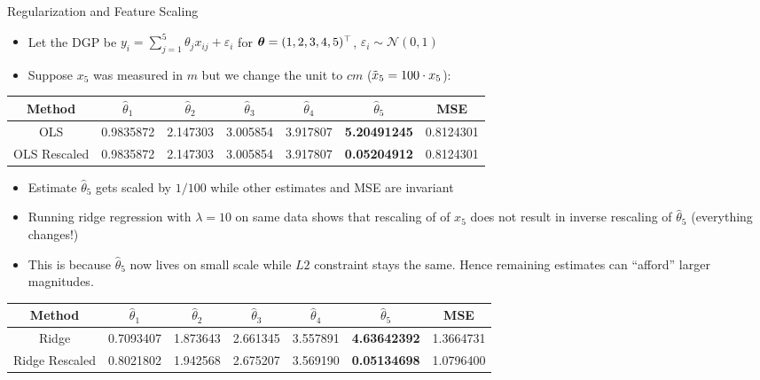 \documentclass[11pt,compress,t,notes=noshow, xcolor=table]{beamer}
\begin{document}
\begin{vbframe}{Regularization and Feature Scaling}
\footnotesize{
\begin{itemize}
    \item Let the DGP be $y_i = \sum_{j=1}^{5} \theta_j x_{ij} +\varepsilon_i$ for $\bm{\theta}=(1,2,3,4,5)^\top$, $\varepsilon_i \sim \mathcal{N}(0,1)$ %
    \item Suppose $x_5$ was measured in $m$ but we change the unit to $cm$ ($\Tilde{x}_5=100 \cdot x_5$):
\end{itemize}
\vspace{-0.4cm}
\begin{table}[h]
\centering
\begin{tabular}{|c|c c c c c c|}
\hline
\textbf{Method} & \( \hat{\theta}_1 \) & \( \hat{\theta}_2 \) & \( \hat{\theta}_3 \) & \( \hat{\theta}_4 \) & \( \hat{\theta}_5 \) & MSE \\ \hline
OLS             & 0.9835872 & 2.147303 & 3.005854 & 3.917807 & \textbf{5.20491245} & 0.8124301 \\ %
OLS Rescaled    & 0.9835872 & 2.147303 & 3.005854 & 3.917807 & \textbf{0.05204912} & 0.8124301 \\ \hline
\end{tabular}
\end{table}
\vspace{-0.1cm}
\begin{itemize}
    \item Estimate $\hat{\theta}_5$ gets scaled by $1/100$ while other estimates and MSE are invariant
    \item Running ridge regression with $\lambda=10$ on same data shows that rescaling of of $x_5$ does not result in inverse rescaling of $\hat{\theta}_5$ (everything changes!)
    \item This is because $\hat{\theta}_5$ now lives on small scale while $L2$ constraint stays the same. Hence remaining estimates can ``afford'' larger magnitudes.
\end{itemize}
\vspace{-0.4cm}
\begin{table}[h]
\centering
\begin{tabular}{|c|c c c c c c|}
\hline
\textbf{Method} & \( \hat{\theta}_1 \) & \( \hat{\theta}_2 \) & \( \hat{\theta}_3 \) & \( \hat{\theta}_4 \) & \( \hat{\theta}_5 \) & MSE \\ \hline
Ridge           & 0.7093407 & 1.873643 & 2.661345 & 3.557891 & \textbf{4.63642392} & 1.3664731 \\ %
Ridge Rescaled  & 0.8021802 & 1.942568 & 2.675207 & 3.569190 & \textbf{0.05134698} & 1.0796400 \\ \hline
\end{tabular}
\end{table}
}


\end{vbframe}
\end{document}

